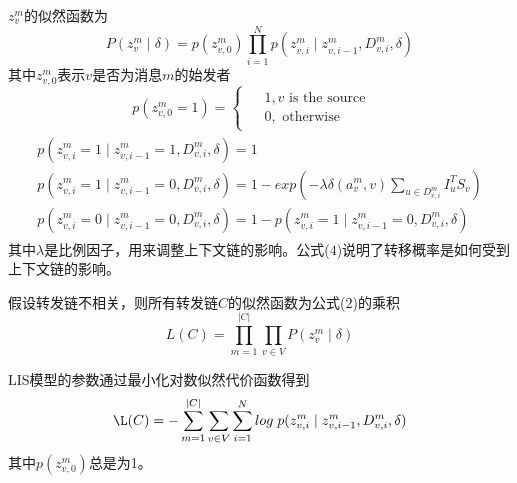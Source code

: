 \documentclass[UTF8]{ctexart}
\begin{document}
\par $z_{v}^{m}$的似然函数为
\begin{equation}
P(z_{v}^{m}\mid \delta )=p(z_{v,0}^{m})\prod _{i=1}^{N}p(z_{v,i}^{m} \mid z_{v,i-1}^{m},D_{v,i}^{m} ,\delta)
\end{equation}
其中$z_{v,0}^{m}$表示$v$是否为消息$m$的始发者
\begin{equation}
p(z_{v,0}^{m}=1)= \left\{\begin{matrix}
\begin{aligned}
& 1,v\text{ is the source}&\\ 
& 0,\text{ otherwise} &
\end{aligned}
\end{matrix}\right.
\end{equation}
\begin{equation}
\begin{matrix}
\begin{aligned}
& p(z_{v,i}^{m}=1 \mid z_{v,i-1}^{m}=1,D_{v,i}^{m},\delta)=1 & \\
& p(z_{v,i}^{m}=1 \mid z_{v,i-1}^{m}=0,D_{v,i}^{m},\delta)=1-exp(-\lambda \delta(a_{v}^{m},v)\sum _{u \in D_{v,i}^{m}}I_{u}^{T}S_{v}) &\\
& p(z_{v,i}^{m}=0 \mid z_{v,i-1}^{m}=0,D_{v,i}^{m},\delta)=1-p(z_{v,i}^{m}=1 \mid z_{v,i-1}^{m}=0,D_{v,i}^{m},\delta) &
\end{aligned}
\end{matrix}
\end{equation}
其中$\lambda$是比例因子，用来调整上下文链的影响。公式($4$)说明了转移概率是如何受到上下文链的影响。
\par 假设转发链不相关，则所有转发链$C$的似然函数为公式($2$)的乘积
\begin{equation}
L(C) = \prod _{m=1}^{\left | C \right |}\prod _{v \in V}P(z_{v}^{m} \mid \delta)
\end{equation}
\par LIS模型的参数通过最小化对数似然代价函数得到
\begin{equation}
\L (C) = -\sum _{m=1}^{\left | C \right |}\sum _{v \in V}\sum _{i=1}^{N}log\; p(z_{v,i}^{m}\mid z_{v,i-1}^{m}, D_{v,i}^{m},\delta)
\end{equation}
其中$p(z_{v,0}^{m})$总是为1。
\end{document}
